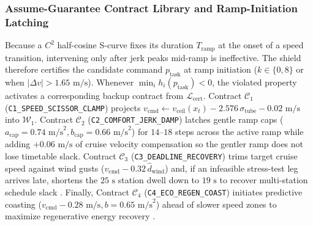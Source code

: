\documentclass[10pt,a4paper]{article}
\begin{document}
\subsubsection{Assume-Guarantee Contract Library and Ramp-Initiation Latching}
Because a $C^2$ half-cosine S-curve fixes its duration $T_{\text{ramp}}$ at the onset of a speed transition, intervening only after jerk peaks mid-ramp is ineffective. The shield therefore certifies the candidate command $p_{\text{task}}$ at ramp initiation ($k \in \{0, 8\}$ or when $|\Delta v| > 1.65\text{ m/s}$). Whenever $\min_i h_i(p_{\text{task}}) < 0$, the violated property activates a corresponding backup contract from $\mathcal{L}_{\text{cert}}$. Contract $\mathcal{C}_1$ (\texttt{C1\_SPEED\_SCISSOR\_CLAMP}) projects $v_{\text{cmd}} \leftarrow v_{\text{ceil}}(x_t) - 2.576\,\sigma_{\text{tube}} - 0.02\text{ m/s}$ into $\mathcal{W}_1$. Contract $\mathcal{C}_2$ (\texttt{C2\_COMFORT\_JERK\_DAMP}) latches gentle ramp caps ($a_{\text{cap}} = 0.74\text{ m/s}^2, b_{\text{cap}} = 0.66\text{ m/s}^2$) for $14\text{--}18$ steps across the active ramp while adding $+0.06\text{ m/s}$ of cruise velocity compensation so the gentler ramp does not lose timetable slack. Contract $\mathcal{C}_3$ (\texttt{C3\_DEADLINE\_RECOVERY}) trims target cruise speed against wind gusts ($v_{\text{cmd}} - 0.32\,\hat{d}_{\text{wind}}$) and, if an infeasible stress-test leg arrives late, shortens the $25\text{ s}$ station dwell down to $19\text{ s}$ to recover multi-station schedule slack \cite{zhong2022}. Finally, Contract $\mathcal{C}_4$ (\texttt{C4\_ECO\_REGEN\_COAST}) initiates predictive coasting ($v_{\text{cmd}} - 0.28\text{ m/s}, b = 0.65\text{ m/s}^2$) ahead of slower speed zones to maximize regenerative energy recovery \cite{xiao2023}.
\end{document}
